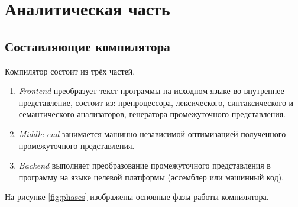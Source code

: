 \section{Аналитическая часть}

\subsection{Составляющие компилятора}
Компилятор состоит из трёх частей.
\begin{enumerate}
	\item \textit{Frontend} преобразует текст программы на исходном языке во внутреннее представление, состоит из: препроцессора, лексического, синтаксического и семантического анализаторов, генератора промежуточного представления.  
	
	\item \textit{Middle-end} занимается машинно-независимой оптимизацией полученного промежуточного представления.
	
	\item \textit{Backend} выполняет преобразование промежуточного представления в программу на языке целевой платформы (ассемблер или машинный код).
\end{enumerate}

На рисунке \ref{fig:phases} изображены основные фазы работы компилятора.

